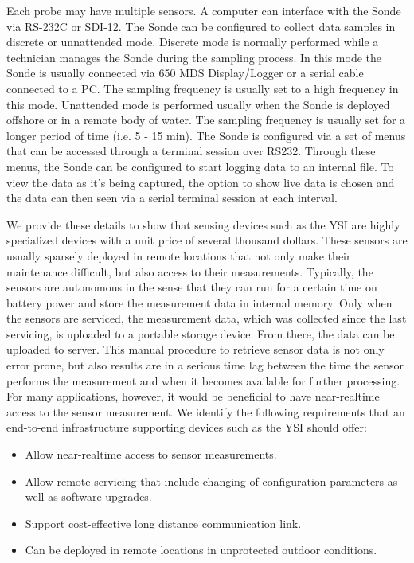 \documentclass[conference]{IEEEtran}
\begin{document}
Each probe may have multiple sensors.  A computer can interface with
the Sonde via RS-232C or SDI-12. The Sonde can be configured to
collect data samples in discrete or unnattended mode.  Discrete mode
is normally performed while a technician manages the Sonde during the
sampling process. In this mode the Sonde is usually connected via 650
MDS Display/Logger or a serial cable connected to a PC.  The sampling
frequency is usually set to a high frequency in this mode.  Unattended
mode is performed usually when the Sonde is deployed offshore or in a
remote body of water.  The sampling frequency is usually set for a
longer period of time (i.e. 5 - 15 min). The Sonde is configured via a
set of menus that can be accessed through a terminal session over
RS232. Through these menus, the Sonde can be configured to start
logging data to an internal file.  To view the data as it's being
captured, the option to show live data is chosen and the data can then
seen via a serial terminal session at each interval.

We provide these details to show that sensing devices such as the YSI
are highly specialized devices with a unit price of several thousand
dollars. These sensors are usually sparsely deployed in remote
locations that not only make their maintenance difficult, but also
access to their measurements.  Typically, the sensors are autonomous
in the sense that they can run for a certain time on battery power and
store the measurement data in internal memory. Only when the sensors
are serviced, the measurement data, which was collected since the last
servicing, is uploaded to a portable storage device. From there, the
data can be uploaded to server. This manual procedure to retrieve
sensor data is not only error prone, but also results are in a serious
time lag between the time the sensor performs the measurement and when
it becomes available for further processing. For many applications,
however, it would be beneficial to have near-realtime access to the
sensor measurement. We identify the following requirements that an
end-to-end infrastructure supporting devices such as the YSI should
offer:

\begin{itemize}
\item Allow near-realtime access to sensor measurements.
\item Allow remote servicing that include changing of configuration
  parameters as well as software upgrades.
\item Support cost-effective long distance communication link.
\item Can be deployed in remote locations in unprotected outdoor
  conditions.
\end{itemize}
\end{document}

